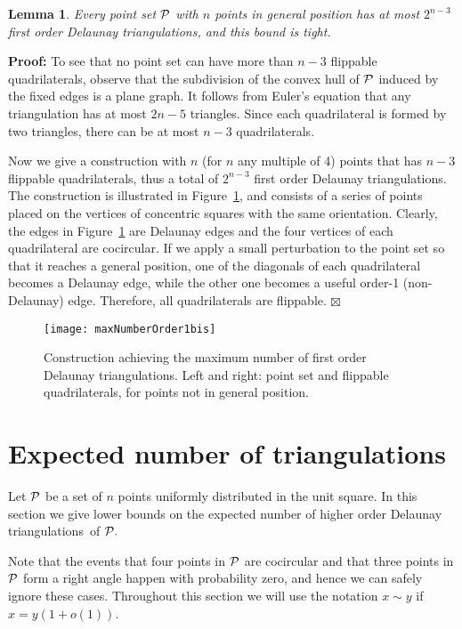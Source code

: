 \documentclass {journal}
\newtheorem {lemma} {Lemma}
\newenvironment {proof}{\textbf {Proof:}}{\hfill \ensuremath {\boxtimes}}
\newcommand{\Pts}{\cal P}
\newcommand {\hodts}{higher order Delaunay triangulations}
\newcommand {\fodts}{first order Delaunay triangulations}
\begin{document}
\begin{lemma} \label{lem:maxfodt}
Every point set $\Pts$ with $n$ points in general position has at most
$2^{n-3}$ \fodts, and this bound is tight.
\end{lemma}
\begin{proof}
To see that no point set can have more than $n-3$ flippable
quadrilaterals, observe that the subdivision of the convex hull of
$\Pts$ induced by the fixed edges is a plane graph. It follows
from Euler's equation that any triangulation has at most $2n-5$
triangles. Since each quadrilateral is formed by two triangles,
there can be at most $n-3$ quadrilaterals.

Now we give a construction with $n$ (for $n$ any multiple of 4)
points that has $n-3$ flippable quadrilaterals, thus a total of
$2^{n-3}$ \fodts. The construction is illustrated in
Figure~\ref{fig:maxNumberOrder1bis}, and consists of a series of
points placed on the vertices of concentric squares with the same
orientation. Clearly, the edges in
Figure~\ref{fig:maxNumberOrder1bis} are Delaunay edges and the
four vertices of each quadrilateral are cocircular. If we apply a
small perturbation to the point set so that it reaches a general
position, one of the diagonals of each quadrilateral becomes a
Delaunay edge, while the other one becomes a useful order-1
(non-Delaunay) edge. Therefore, all quadrilaterals are flippable.
\end{proof}

\begin{figure}[tb]
\centering
\texttt{[image: maxNumberOrder1bis]}
\caption{Construction achieving the maximum number of \fodts. Left
and right: point set and flippable quadrilaterals, for points not
in general position.} \label{fig:maxNumberOrder1bis}
\end{figure}



\section{Expected number of triangulations}
\label{sec:ExpNumTriang} Let $\Pts$ be a set of $n$ points
uniformly distributed in the unit square. In this section we give
lower bounds on the expected number of \hodts\ of $\Pts.$

Note  that the events that four points in $\Pts$
are cocircular and that three points in $\Pts$ form a right angle
happen with probability zero, and hence we can safely ignore these cases. Throughout this section we will use the notation $x \sim y$ if $x=y(1+o(1))$.
\end{document}
